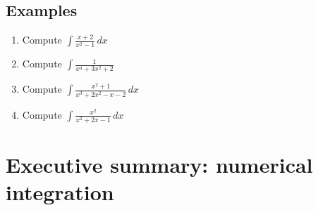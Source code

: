 \subsection*{Examples}
\begin{enumerate}
  \item Compute $\displaystyle\int \frac{x+2}{x^2-1}\, dx$
  \item Compute $\displaystyle\int\frac{1}{x^4+3x^2+2}$
  \item Compute $\displaystyle\int\frac{x^2+1}{x^3+2x^2-x-2}\, dx$
  \item Compute $\displaystyle\int \frac{x^2}{x^2+2x-1}\, dx$
\end{enumerate}




\newpage

\section{Executive summary: numerical integration}

\thispagestyle{fancy}







